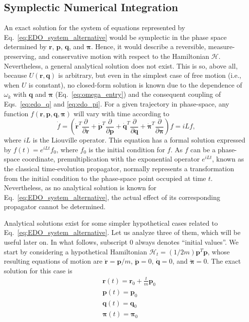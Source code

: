 \documentclass[aip,jcp,reprint,amsmath,amssymb]{revtex4-1}
\newcommand{\vt}[1]{\boldsymbol{\mathbf{#1}}}           %
\newcommand{\tr}[1]{#1^T}                               %
\newcommand{\diff}[2]{\dfrac{\partial #1}{\partial #2}} %
\begin{document}
\subsection{Symplectic Numerical Integration}  
\label{symplectic}
An exact solution for the system of equations represented by Eq.~\ref{eq:EDO_system_alternative} would be symplectic in the phase space determined by $\vt r$, $\vt p$, $\vt q$, and $\vt \pi$. Hence, it would describe a reversible, measure-preserving, and conservative motion with respect to the Hamiltonian $\mathcal{H}$. Nevertheless, a general analytical solution does not exist. This is so, above all, because $U(\vt r, \vt q)$ is arbitrary, but even in the simplest case of free motion (i.e., when $U$ is constant), no closed-form solution is known due to the dependence of $\omega_k$ with $\vt q$ and $\vt \pi$ (Eq.~\ref{eq:omega_entry}) and the consequent coupling of Eqs.~\ref{eq:edo_q} and \ref{eq:edo_pi}. For a given trajectory in phase-space, any function $f(\vt r, \vt p, \vt q, \vt \pi)$ will vary with time according to
\[
\dot{f} = \left( \tr{\dot{\vt r}} \diff{}{\vt r} + \tr{\dot{\vt p}} \diff{}{\vt p} + \tr{\dot{\vt q}} \diff{}{\vt q} + \tr{\dot{\vt \pi}} \diff{}{\vt \pi} \right) f = i L f,
\]
where $i L$ is the Liouville operator. This equation has a formal solution expressed by $f(t) = e^{i L t}f_0$, where $f_0$ is the initial condition for $f$. As $f$ can be a phase-space coordinate, premultiplication with the exponential operator $e^{i L t}$, known as the classical time-evolution propagator,\cite{Tuckerman2008} normally represents a transformation from the initial condition to the phase-space point occupied at time $t$. Nevertheless, as no analytical solution is known for Eq.~\ref{eq:EDO_system_alternative}, the actual effect of its corresponding propagator cannot be determined.

Analytical solutions exist for some simpler hypothetical cases related to Eq.~\ref{eq:EDO_system_alternative}. Let us analyze three of them, which will be useful later on. In what follows, subscript $0$ always denotes ``initial values''. We start by considering a hypothetical Hamiltonian $\mathcal{H}_t = (1/2m) \tr{\vt p} \vt p$, whose resulting equations of motion are $\dot{\vt r} = {\vt p}/m$, $\dot{\vt p} = 0$, $\dot{\vt q} = 0$, and $\dot{\vt \pi} = 0$. The exact solution for this case is
\begin{align*}
&{\vt r}(t) = {\vt r}_0 + \frac{t}{m} {\vt p}_0 \\
&{\vt p}(t) = {\vt p}_0 \\
&{\vt q}(t) = {\vt q}_0 \\
&{\vt \pi}(t) = {\vt \pi}_0
\end{align*}
\end{document}
